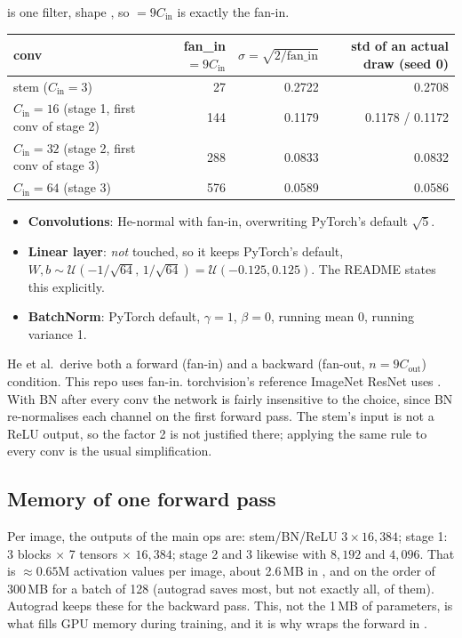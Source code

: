 \begin{repo}
 is one filter, shape , so  $=9C_\text{in}$ is exactly the fan-in.
\begin{center}
\small
\begin{tabular}{@{}lrrr@{}}
\toprule
conv & fan\_in $=9C_\text{in}$ & $\sigma=\sqrt{2/\text{fan\_in}}$ & std of an actual draw (seed 0)\\
\midrule
stem ($C_\text{in}{=}3$) & 27 & 0.2722 & 0.2708\\
$C_\text{in}{=}16$ (stage 1, first conv of stage 2) & 144 & 0.1179 & 0.1178 / 0.1172\\
$C_\text{in}{=}32$ (stage 2, first conv of stage 3) & 288 & 0.0833 & 0.0832\\
$C_\text{in}{=}64$ (stage 3) & 576 & 0.0589 & 0.0586\\
\bottomrule
\end{tabular}
\end{center}
\begin{itemize}[nosep]
  \item \textbf{Convolutions}: He-normal with fan-in, overwriting PyTorch's default $\sqrt5$\code{)}.
  \item \textbf{Linear layer}: \emph{not} touched, so it keeps PyTorch's default, $W,b\sim\mathcal U(-1/\sqrt{64},\,1/\sqrt{64})=\mathcal U(-0.125,0.125)$. The README states this explicitly.
  \item \textbf{BatchNorm}: PyTorch default, $\gamma=1$, $\beta=0$, running mean 0, running variance 1.
\end{itemize}
\end{repo}

\begin{warn}
He et al.\ derive both a forward (fan-in) and a backward (fan-out, $n=9C_\text{out}$) condition. This repo uses fan-in. torchvision's reference ImageNet ResNet uses . With BN after every conv the network is fairly insensitive to the choice, since BN re-normalises each channel on the first forward pass. The stem's input is not a ReLU output, so the factor 2 is not justified there; applying the same rule to every conv is the usual simplification.
\end{warn}

\subsection{Memory of one forward pass}

Per image, the outputs of the main ops are: stem/BN/ReLU $3\times16{,}384$; stage 1: 3 blocks $\times$ 7 tensors $\times$ $16{,}384$; stage 2 and 3 likewise with $8{,}192$ and $4{,}096$. That is $\approx 0.65$M activation values per image, about 2.6\,MB in , and on the order of 300\,MB for a batch of 128 (autograd saves most, but not exactly all, of them). Autograd keeps these for the backward pass. This, not the 1\,MB of parameters, is what fills GPU memory during training, and it is why  wraps the forward in .
